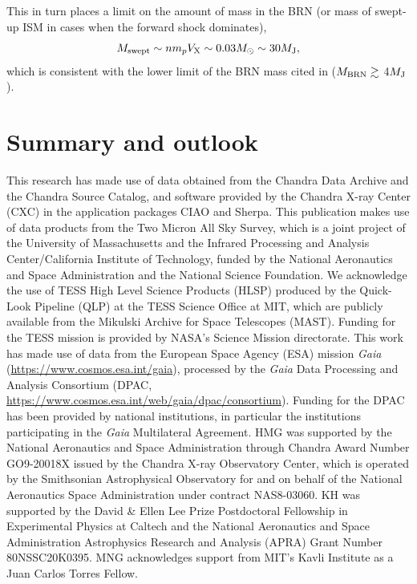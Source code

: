 \documentclass[]{aastex631}
\newcommand{\be}{\begin{equation}}
\newcommand{\ee}{\end{equation}}
\begin{document}
This in turn places a limit on the amount of mass in the BRN (or mass of swept-up ISM in cases when the forward shock dominates),
\be
M_{\rm swept} \sim n m_p V_{\rm X} \sim 0.03M_{\odot} \sim 30M_{\rm J},
\ee
which is consistent with the lower limit of the BRN mass cited in \citet{2020Natur.587..387H} ($M_{\rm BRN} \gtrsim$ 4$M_{\rm J}$).


\section{Summary and outlook}
\label{sec:summary}

\begin{acknowledgements}
This research has made use of data obtained from the Chandra Data Archive and the Chandra Source Catalog, and software provided by the Chandra X-ray Center (CXC) in the application packages CIAO and Sherpa. This publication makes use of data products from the Two Micron All Sky Survey, which is a joint project of the University of Massachusetts and the Infrared Processing and Analysis Center/California Institute of Technology, funded by the National Aeronautics and Space Administration and the National Science Foundation. We acknowledge the use of TESS High Level Science Products (HLSP) produced by the Quick-Look Pipeline (QLP) at the TESS Science Office at MIT, which are publicly available from the Mikulski Archive for Space Telescopes (MAST). Funding for the TESS mission is provided by NASA's Science Mission directorate.
This work has made use of data from the European Space Agency (ESA) mission {\it Gaia} (\url{https://www.cosmos.esa.int/gaia}), processed by the {\it Gaia} Data Processing and Analysis Consortium (DPAC, \url{https://www.cosmos.esa.int/web/gaia/dpac/consortium}). Funding for the DPAC has been provided by national institutions, in particular the institutions participating in the {\it Gaia} Multilateral Agreement.
HMG was supported by the National Aeronautics and Space Administration through Chandra Award Number GO9-20018X issued by the Chandra X-ray Observatory Center, which is operated by the Smithsonian Astrophysical Observatory for and on behalf of the National Aeronautics Space Administration under contract NAS8-03060.
KH was supported by the David {\&} Ellen Lee Prize Postdoctoral Fellowship in Experimental Physics at Caltech and the National Aeronautics and Space Administration Astrophysics Research and Analysis (APRA) Grant Number 80NSSC20K0395.
MNG acknowledges support from MIT's Kavli Institute as a Juan Carlos Torres Fellow.
\end{acknowledgements}
\end{document}
